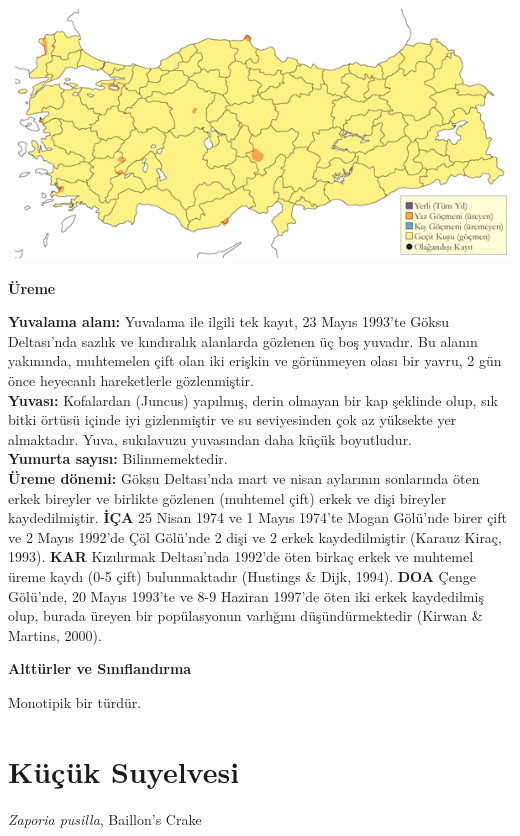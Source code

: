 \documentclass[
  a4paper,
  DIV=11,
  numbers=noendperiod]{scrreprt}
\begin{document}
\includegraphics{images/harita_Page_117.png}

\textbf{Üreme}

\textbf{Yuvalama alanı:} Yuvalama ile ilgili tek kayıt, 23 Mayıs 1993'te
Göksu Deltası'nda sazlık ve kındıralık alanlarda gözlenen üç boş
yuvadır. Bu alanın yakınında, muhtemelen çift olan iki erişkin ve
görünmeyen olası bir yavru, 2 gün önce heyecanlı hareketlerle
gözlenmiştir.\\
\textbf{Yuvası:} Kofalardan (Juncus) yapılmış, derin olmayan bir kap
şeklinde olup, sık bitki örtüsü içinde iyi gizlenmiştir ve su
seviyesinden çok az yüksekte yer almaktadır. Yuva, sukılavuzu yuvasından
daha küçük boyutludur.\\
\textbf{Yumurta sayısı:} Bilinmemektedir.\\
\textbf{Üreme dönemi:} Göksu Deltası'nda mart ve nisan aylarının
sonlarında öten erkek bireyler ve birlikte gözlenen (muhtemel çift)
erkek ve dişi bireyler kaydedilmiştir. \textbf{İÇA} 25 Nisan 1974 ve 1
Mayıs 1974'te Mogan Gölü'nde birer çift ve 2 Mayıs 1992'de Çöl Gölü'nde
2 dişi ve 2 erkek kaydedilmiştir (Karauz Kiraç, 1993). \textbf{KAR}
Kızılırmak Deltası'nda 1992'de öten birkaç erkek ve muhtemel üreme kaydı
(0-5 çift) bulunmaktadır (Hustings \& Dijk, 1994). \textbf{DOA} Çenge
Gölü'nde, 20 Mayıs 1993'te ve 8-9 Haziran 1997'de öten iki erkek
kaydedilmiş olup, burada üreyen bir popülasyonun varlığını
düşündürmektedir (Kirwan \& Martins, 2000).

\textbf{Alttürler ve Sınıflandırma}

Monotipik bir türdür.

\section{Küçük Suyelvesi}\label{kuxfcuxe7uxfck-suyelvesi}

\emph{Zaporia pusilla}, Baillon's Crake
\end{document}
